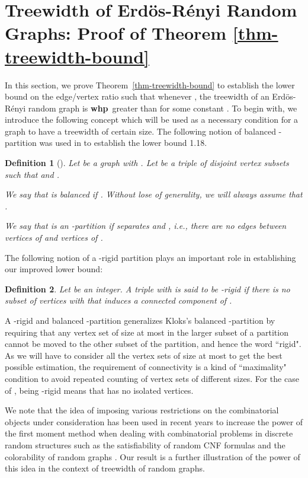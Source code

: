 \documentclass[11pt]{article}
\newtheorem{definition}{Definition}[section]
\providecommand{\whp}{\textbf{whp}}
\begin{document}
\section{Treewidth of Erd\"{o}s-R\'{e}nyi Random Graphs: Proof of Theorem \ref{thm-treewidth-bound}}
\label{sec-thm-1}
In this section, we prove Theorem~\ref{thm-treewidth-bound} to establish 
the lower bound  on the edge/vertex ratio  such that  
whenever ,  
the treewidth of an  Erd\"{o}s-R\'{e}nyi random graph  
is \whp~greater than  for some constant .
To begin with, we introduce the following concept which will be used as a necessary condition 
for a graph to have a treewidth of certain size. The following notion of
balanced -partition was used in \cite{kloks94} to establish the lower bound 1.18.
\begin{definition}[\cite{kloks94}]
\label{rigid_partition_def}
Let  be a graph with . 
Let  be a triple of disjoint vertex subsets such that 
 and .  

We say that  is balanced if 
. 
Without lose of generality, we will always assume that .

We say that  is an -partition if 
 separates  and , i.e., there are no edges between vertices of  and vertices of . 
\end{definition}

The following notion of a -rigid partition plays an important role in establishing
our improved lower bound: 
\begin{definition}
Let  be an integer. A triple  with  is said to be -rigid if there is no subset of vertices  with  that induces
a connected component of .
\end{definition}

A -rigid and balanced -partition generalizes Kloks's balanced -partition by
requiring that any vertex set of size at most  in the larger subset of a partition cannot be
moved to the other subset of the partition, and hence the word ``rigid". As we will have to consider all the vertex sets of size at most  to get the best possible estimation, 
the requirement of connectivity is a kind of ``maximality" condition to avoid repeated counting 
of vertex sets of different sizes. For the case of 
, being -rigid means that  has no isolated vertices.

We note that the idea of imposing various restrictions on the combinatorial objects  under consideration has been used in recent years to increase the power of 
the first moment method when dealing with combinatorial problems in 
discrete random structures such as the satisfiability of 
random CNF formulas \cite{kirousis94threshold,kirousis09threshold} and 
the colorability of random graphs \cite{achlioptas99thesis}.      
Our result is a further illustration of the power of this idea in the context 
of treewidth of random graphs.
\end{document}
